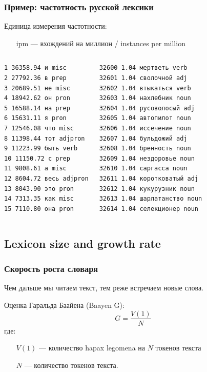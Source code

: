 \documentclass[svgnames]{beamer}
\begin{document}
\begin{frame}[fragile]
  \frametitle{Пример: частотность русской лексики}
  Единица измерения частотности:
  \begin{itemize}
  \item[ipm] — вхождений на миллион / instances per million 
  \end{itemize}
  \small
  \begin{columns}
    
\begin{verbatim}
1 36358.94 и misc 
2 27792.36 в prep 
3 20689.51 не misc 
4 18942.62 он pron 
5 16588.14 на prep 
6 15631.11 я pron 
7 12546.08 что misc 
8 11398.44 тот adjpron
9 11223.99 быть verb 
10 11150.72 с prep 
11 9808.61 а misc 
12 8604.72 весь adjpron
13 8043.90 это pron 
14 7313.35 как misc 
15 7110.80 она pron 
\end{verbatim}
\begin{verbatim}
32600 1.04 мертветь verb
32601 1.04 сволочной adj
32602 1.04 втыкаться verb
32603 1.04 нахлебник noun
32604 1.04 русоволосый adj
32605 1.04 автопилот noun
32606 1.04 иссечение noun
32607 1.04 бульдожий adj
32608 1.04 бренность noun
32609 1.04 нездоровье noun
32610 1.04 саргасса noun
32611 1.04 коротковатый adj
32612 1.04 кукурузник noun
32613 1.04 шарлатанство noun
32614 1.04 селекционер noun
\end{verbatim}
  \end{columns}
\end{frame}
  

\subsection{Lexicon size and growth rate}


\begin{frame}
  \frametitle{Скорость роста словаря}
  Чем дальше мы читаем текст, тем реже встречаем новые слова.

  Оценка Гаральда Баайена (Baayen G):
  \begin{equation}
    G = \frac{V(1)}{N}
  \end{equation}
где: 
\begin{itemize}
\item[$V(1)$] — количество hapax legomena на $N$ токенов текста
\item[$N$] — количество токенов текста.
\end{itemize}
\end{frame}
\end{document}
